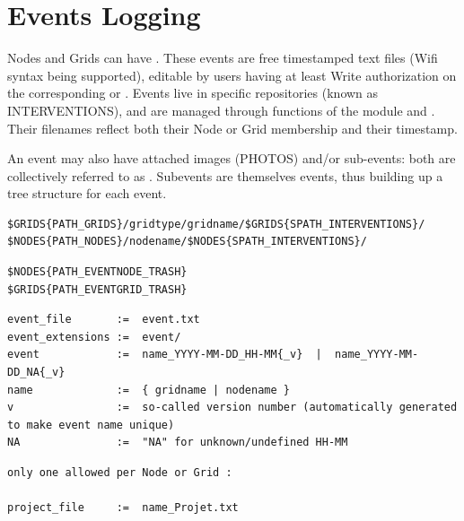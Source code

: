 \section{Events Logging}
\label{events_logging}

Nodes and Grids can have . These events are free timestamped text files (Wifi syntax being supported), editable by users having at least Write authorization on the corresponding  or . Events live in specific repositories (known as INTERVENTIONS), and are managed through functions of the  module and . Their filenames reflect both their Node or Grid membership and their timestamp. 

An event may also have attached images (PHOTOS) and/or sub-events: both are collectively referred to as . 
Subevents are themselves events, thus building up a tree structure for each event.

\begin{lstlisting}[title=Events base directories (interventions)]
$GRIDS{PATH_GRIDS}/gridtype/gridname/$GRIDS{SPATH_INTERVENTIONS}/
$NODES{PATH_NODES}/nodename/$NODES{SPATH_INTERVENTIONS}/
\end{lstlisting}

\begin{lstlisting}[title=Events 'trash' directories (for deleted events)]
$NODES{PATH_EVENTNODE_TRASH}
$GRIDS{PATH_EVENTGRID_TRASH}
\end{lstlisting}

\begin{lstlisting}[title=Events files and extensions naming conventions]
event_file       :=  event.txt
event_extensions :=  event/
event            :=  name_YYYY-MM-DD_HH-MM{_v}  |  name_YYYY-MM-DD_NA{_v}  
name             :=  { gridname | nodename }
v                :=  so-called version number (automatically generated to make event name unique)
NA               :=  "NA" for unknown/undefined HH-MM
\end{lstlisting}

\begin{lstlisting}[title=Special event file: the Project]
only one allowed per Node or Grid :

project_file     :=  name_Projet.txt
\end{lstlisting}


